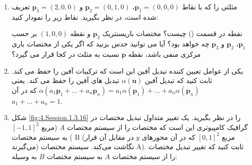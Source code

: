 {\begin{spacing}{1.5}
\begin{enumerate}[label=\textbf{\arabic*}.]
            \item {
                مثلثی را که با نقاط $\textbf{p}_{1}=(0,0,0)$، $\textbf{p}_{2}=(0,1,0)$ و $\textbf{p}_{3}=(2,0,0)$ تعریف شده است، در نظر بگیرید. نقاط زیر را نمودار کنید:
                 \textbf{\vspace{-6pt}}

                نقطه در قسمت () چیست؟ مختصات باریسنتریک $\textbf{p}_{2}$ و نقطه $(1,0,0)$ بر حسب $\textbf{p}_{1}$، $\textbf{p}_{2}$ و $\textbf{p}_{3}$ چه خواهد بود؟ آیا می توانید حدس بزنید که اگر یکی از مختصات باری مرکزی منفی باشد، نقطه $\textbf{p}$ نسبت به مثلث در کجا قرار می گیرد؟
            }

            \item {یکی از عوامل تعیین کننده تبدیل آفین این است که ترکیبات آفین را حفظ می کند.
            ثابت کنید که تبدیل آفین $\alpha(\textbf{u})$ تبدیل های آفین را حفظ می کند.
            یعنی $\alpha(a_{1}\textbf{p}_{1}+...+a_{n}\textbf{p}_{n})=a_{1}\alpha(\textbf{p}_{1})+...+a_{n}\alpha(\textbf{p}_{n})$ که در آن $a_{1}+...+a_{n}=1$.}

            \item {
                شکل \ref{fig:4.Session.1.3.16} را در نظر بگیرید.
                یک تغییر متداول تبدیل مختصات در گرافیک کامپیوتری این است که مختصات را از سیستم مختصات $A$ (مربع $[-1,1]^{2}$) به سیستم مختصات B (مربع $[0,1]^{2}$ که در آن محورهای $y$ در مقابل آن قرار می‌گیرند) نگاشت می‌کند. سیستم مختصات A).
                ثابت کنید که تغییر تبدیل مختصات را از سیستم مختصات $A$ به سیستم مختصات $B$ به وسیله:

}
\end{enumerate}
\end{spacing}}
